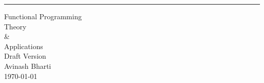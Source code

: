 \begin{titlepage}
\raggedright

\begin{flushright}
    \rule{16cm}{5pt}\vskip1cm
    \begin{bfseries}
        \Huge{Functional Programming \\ Theory \\ \& \\ Applications  }\\
        \vspace{1.9cm}
        \small{Draft Version }\\
        \vspace{1.9cm}
       \small{ Avinash Bharti }\\
        \vspace{1.9cm}
        \today\\
    \end{bfseries}
\end{flushright}
\end{titlepage}
